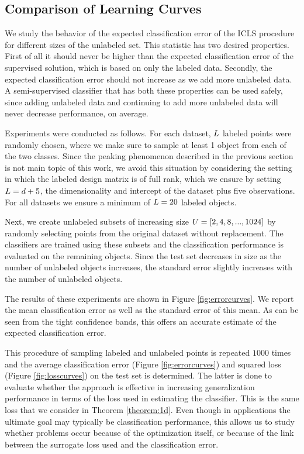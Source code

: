 \documentclass{elsarticle}
\begin{document}
\subsection{Comparison of Learning Curves}
We study the behavior of the expected classification error of the ICLS procedure for different sizes of the unlabeled set. This statistic has two desired properties. First of all it should never be higher than the expected classification error of the supervised solution, which is based on only the labeled data. Secondly, the expected classification error should not increase as we add more unlabeled data. A semi-supervised classifier that has both these properties can be used safely, since adding unlabeled data and continuing to add more unlabeled data will never decrease performance, on average. 

Experiments were conducted as follows. For each dataset, $L$ labeled points were randomly chosen, where we make sure to sample at least 1 object from each of the two classes. Since the peaking phenomenon described in the previous section is not main topic of this work, we avoid this situation by considering the setting in which the labeled design matrix is of full rank, which we ensure by setting $L=d+5$, the dimensionality and intercept of the dataset plus five observations. For all datasets we ensure a minimum of $L=20$ labeled objects.

Next, we create unlabeled subsets of increasing size $U=[2,4,8,...,1024]$ by randomly selecting points from the original dataset without replacement. The classifiers are trained using these subsets and the classification performance is evaluated on the remaining objects. Since the test set decreases in size as the number of unlabeled objects increases, the standard error slightly increases with the number of unlabeled objects.

The results of these experiments are shown in Figure \ref{fig:errorcurves}. We report the mean classification error as well as the standard error of this mean. As can be seen from the tight confidence bands, this offers an accurate estimate of the expected classification error.

This procedure of sampling labeled and unlabeled points is repeated $1000$ times and the average classification error (Figure \ref{fig:errorcurves}) and squared loss (Figure \ref{fig:losscurves}) on the test set is determined. The latter is done to evaluate whether the approach is effective in increasing generalization performance in terms of the loss used in estimating the classifier. This is the same loss that we consider in Theorem \ref{theorem:1d}. Even though in applications the ultimate goal may typically be classification performance, this allows us to study whether problems occur because of the optimization itself, or because of the link between the surrogate loss used and the classification error.
\end{document}
